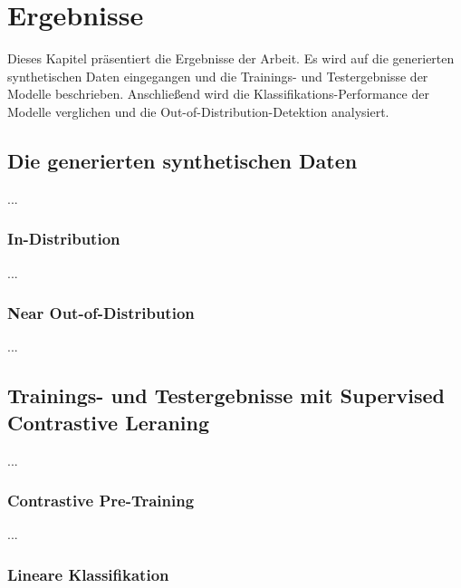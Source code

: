 \chapter{Ergebnisse}

Dieses Kapitel präsentiert die Ergebnisse der Arbeit. Es wird auf die generierten synthetischen Daten eingegangen und die Trainings- und Testergebnisse der Modelle beschrieben. Anschließend wird die Klassifikations-Performance der Modelle verglichen und die Out-of-Distribution-Detektion analysiert.

\section{Die generierten synthetischen Daten}

...

\subsection{In-Distribution}

...

\subsection{Near Out-of-Distribution}

...

\section{Trainings- und Testergebnisse mit Supervised Contrastive Leraning}

...

\subsection{Contrastive Pre-Training}

...

\subsection{Lineare Klassifikation}

